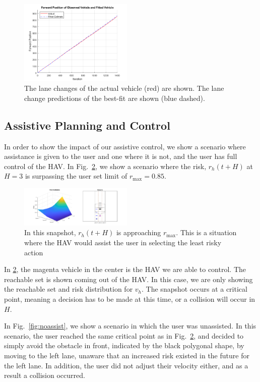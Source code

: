 \documentclass[letterpaper, 10 pt, conference]{ieeeconf}  %
\begin{document}
\begin{figure}[ht]
    \includegraphics[width=0.48\textwidth]{fig/fit1.png}
    \caption{The lane changes of the actual vehicle (red) are shown. The lane change predictions of the best-fit are shown (blue dashed).} \label{fig:lanchan}
\end{figure}
 
 

 
\subsection{Assistive Planning and Control}
In order to show the impact of our assistive control, we show a scenario where assistance is given to the user and one where it is not, and the user has full control of the HAV. In Fig.~\ref{fig:critpt}, we show a scenario where the risk, $r_h(t+H)$ at $H=3$ is surpassing the user set limit of $r_{\max} = 0.85$.


\begin{figure}[ht] 
    \includegraphics[width=0.48\textwidth]{fig/critpt.png}
    \caption {In this snapshot, $r_h(t+H)$ is approaching $r_{\max}$. This is a situation where the HAV would assist the user in selecting the least risky action} \label{fig:critpt}
\end{figure}

In \ref{fig:critpt}, the magenta vehicle in the center is the HAV we are able to control. The reachable set is shown coming out of the HAV. In this case, we are only showing the reachable set and risk distribution for $v_h$. The snapshot occurs at a critical point, meaning a decision has to be made at this time, or a collision will occur in $H$. 


In Fig.~\ref{fig:noassist}, we show a scenario in which the user was unassisted. In this scenario, the user reached the same critical point as in Fig.~\ref{fig:critpt}, and decided to simply avoid the obstacle in front, indicated by the black polygonal shape, by moving to the left lane, unaware that an increased risk existed in the future for the left lane. In addition, the user did not adjust their velocity either, and as a result a collision occurred.
\end{document}
